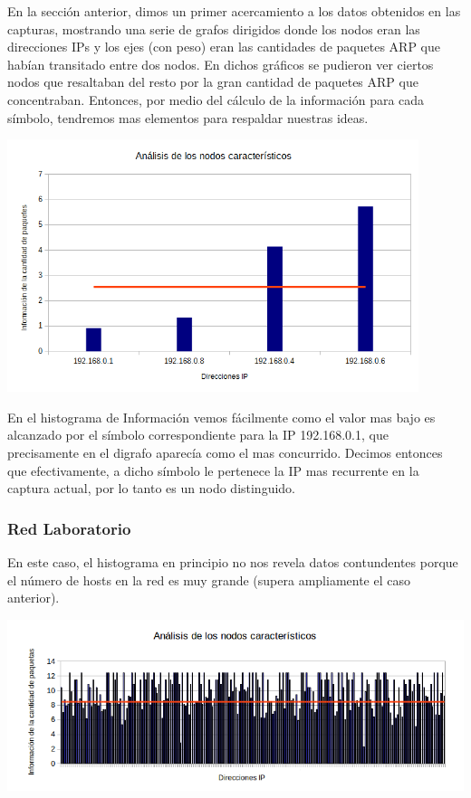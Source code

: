 En la sección anterior, dimos un primer acercamiento a los datos obtenidos en las capturas, mostrando una serie de grafos dirigidos donde los nodos eran las direcciones IPs y los ejes (con peso) eran las cantidades de paquetes ARP que habían transitado entre dos nodos. En dichos gráficos se pudieron ver ciertos nodos que resaltaban del resto por la gran cantidad de paquetes ARP que concentraban. Entonces, por medio del cálculo de la información para cada símbolo, tendremos mas elementos para respaldar nuestras ideas.

\centerline{\includegraphics[width=0.9\textwidth]{./graficos/paquetesVSIP/casa_mari.png}}

En el histograma de Información vemos fácilmente como el valor mas bajo es alcanzado por el símbolo correspondiente para la IP 192.168.0.1, que precisamente en el digrafo aparecía como el mas concurrido. Decimos entonces que efectivamente, a dicho símbolo le pertenece la IP mas recurrente en la captura actual, por lo tanto es un nodo distinguido.

\subsubsection{Red Laboratorio}

En este caso, el histograma en principio no nos revela datos contundentes porque el número de hosts en la red es muy grande (supera ampliamente el caso anterior).

\centerline{\includegraphics[width=1\textwidth]{./graficos/paquetesVSIP/labo5_muchos.png}}

